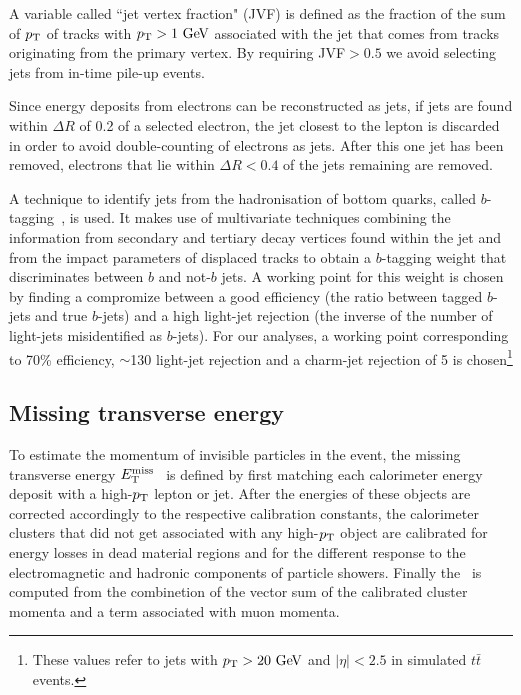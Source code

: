 A variable called ``jet vertex fraction" (JVF) is defined as the fraction
of the sum of $\pt$ of tracks with $\pt>1\gev$
associated with the jet that comes from tracks originating from the primary vertex.
By requiring JVF$>0.5$ we avoid selecting jets from in-time pile-up events.

Since energy deposits from electrons can be reconstructed as jets, 
if jets are found within $\Delta R$ of 0.2 of a selected electron, the
jet closest to the lepton is discarded in order to avoid double-counting of electrons as jets.
After this one jet has been removed, electrons that lie within $\Delta R< 0.4$ of 
the jets remaining are removed.

A technique to identify jets from the hadronisation of bottom quarks, 
called $b$-tagging~\cite{ref:ATLAS-CONF-2011-102}, is used. It
makes use of multivariate techniques combining the information
from secondary and tertiary decay vertices found within the jet
and from the impact parameters of displaced tracks to obtain a 
$b$-tagging weight that discriminates between $b$ and not-$b$
jets. A working point for this weight is chosen by finding
a compromize between a good efficiency (the ratio between tagged 
$b$-jets and true $b$-jets) and a high light-jet rejection
(the inverse of the number of light-jets misidentified as $b$-jets).
For our analyses, a working point corresponding to  70\% efficiency, 
$\sim$130 light-jet rejection and a charm-jet rejection of 5 is 
chosen\footnote{These values refer to jets with $\pt >20\gev$ and 
$|\eta|<2.5$ in simulated $t\bar{t}$ events.}


\subsection{Missing transverse energy}\label{sec:met}

To estimate the momentum of invisible particles in the event,
the missing transverse energy $\met$~\cite{met} is defined by first matching each calorimeter energy 
deposit with a high-$\pt$ lepton or jet. After the energies of these objects are
corrected accordingly to the respective calibration constants, the calorimeter clusters
that did not get associated with any  high-$\pt$ object are calibrated for energy losses in 
dead material regions and for the different response to the electromagnetic and hadronic
components of particle showers. Finally the \met\ is computed from the combinetion of the vector 
sum of the calibrated cluster momenta and a term associated with muon momenta.
